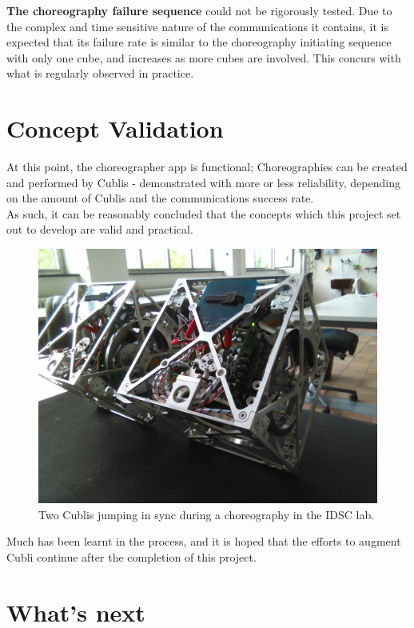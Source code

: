 \textbf{The choreography failure sequence} could not be rigorously tested. Due to the complex and time sensitive nature of the communications it contains, it is expected that its failure rate is similar to the choreography initiating sequence with only one cube, and increases as more cubes are involved. This concurs with what is regularly observed in practice.

\section{Concept Validation}

At this point, the choreographer app is functional; Choreographies can be created and performed by Cublis - demonstrated with more or less reliability, depending on the amount of Cublis and the communications success rate.\\

As such, it can be reasonably concluded that the concepts which this project set out to develop are valid and practical.    

\begin{figure}[H]
   \centering
   \includegraphics[width=1\textwidth]{img/Performing.jpg}
   \caption{Two Cublis jumping in sync during a choreography in the IDSC lab.}
   \label{img:performing}
\end{figure}

Much has been learnt in the process, and it is hoped that the efforts to augment Cubli continue after the completion of this project.

\section{What's next}

